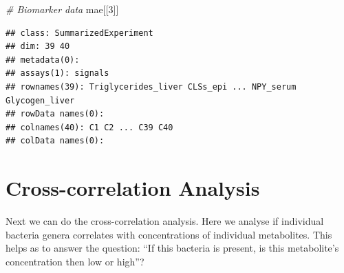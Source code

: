 \documentclass[
]{book}
\newenvironment{Shaded}{\begin{snugshade}}{\end{snugshade}}
\newcommand{\CommentTok}[1]{\textcolor[rgb]{0.56,0.35,0.01}{\textit{#1}}}
\newcommand{\DecValTok}[1]{\textcolor[rgb]{0.00,0.00,0.81}{#1}}
\newcommand{\NormalTok}[1]{#1}
\begin{document}
\begin{Shaded}
\begin{Highlighting}[]
\CommentTok{\# Biomarker data}
\NormalTok{mae[[}\DecValTok{3}\NormalTok{]]}
\end{Highlighting}
\end{Shaded}

\begin{verbatim}
## class: SummarizedExperiment 
## dim: 39 40 
## metadata(0):
## assays(1): signals
## rownames(39): Triglycerides_liver CLSs_epi ... NPY_serum Glycogen_liver
## rowData names(0):
## colnames(40): C1 C2 ... C39 C40
## colData names(0):
\end{verbatim}

\hypertarget{cross-correlation-analysis}{%
\section{Cross-correlation Analysis}\label{cross-correlation-analysis}}

Next we can do the cross-correlation analysis.
Here we analyse if individual bacteria genera correlates
with concentrations of individual metabolites. This helps as to answer the question:
``If this bacteria is present, is this metabolite's concentration then low or high''?
\end{document}
